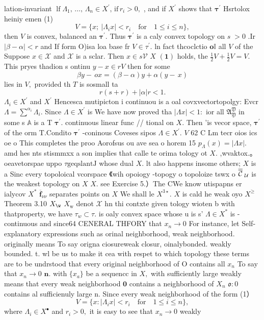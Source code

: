 lation-invariant $\operatorname*{lf}\Lambda_{1},\,\ldots,\,\Lambda_{n}\in X^{\prime},\,\mathrm{if}\,r_{i}>0,$ , and if $X^{\prime}$ shows that ${\boldsymbol{\tau}}^{\prime}$ Hsrtolox heiniy emen (1) $$ V=\{x;\ |\Lambda_{i}x|<r_{i}\quad\mathrm{for}\quad1\leq i\leq n\}, $$ then ${\mathbf{}}V$ is convex, balanced an ${\boldsymbol{\tau}}^{\prime}.$ Thus ${\boldsymbol{\tau}}^{\prime}$ is a caly convex topology on $\scriptstyle s\;>0$ .Ir $|\beta-\alpha|<r$ and If form O)isa loa base fr $V\in\tau^{'}.$ ln fact thcoclctio $\mathbf{o}\mathbb{I}$ all ${\mathbf{}}V$ of the Suppose $x\in{\mathcal{X}}$ and $\scriptstyle{\mathcal{X}}$ is a sclar. Then $x\in s{\mathcal{V}}$ $\textstyle X$ $\mathbf{(1)}$ holds, the $\textstyle{\frac{1}{2}}V+{\frac{1}{2}}V=V.$ This pryes thadion s ontinu $y-x\in r V$ then for some $$ \beta y-\,o x=(\beta-\alpha)y+\alpha(y-\,x) $$ lies in ${\mathit{V}},$ provided th ${\mathbf{}}T$ is sosmall ta $$ r(s+r)+|\alpha|r<1. $$ $\Lambda_{i}\in X^{\prime}$ and $X^{\prime}$ Hencesca mutipicton i continuou is a oal covxvectortopolgy: Evcr $\Lambda=\sum^{\alpha_{i}}\Lambda_{i}.$ Since $\Lambda\in X^{\prime}$ is We have now proved tha $|\Lambda x|<1:$ ior all ${\mathfrak{A}}_{\mathfrak{Y}}^{\mathfrak{Y}}$ in some s $\mathbb{A}$ is a T ${\boldsymbol{\tau}}^{\prime}.$ continuous linear func // tional on $X.$ Then 'is vecor space, ${\boldsymbol{\tau}}^{\prime}$ of the orm T.Condito ${\boldsymbol{\tau}}^{\prime}$ -coninous Coveses sipos $\Lambda\in X^{\prime}.$ ${\mathbf{}}V$ 62 C Lm tecr oios ics oe o This completes the proo Aorofsus ou ave sea o horem 15 $p_{\Lambda}(x)=|\Lambda x|.$ amd hes nts stismmxx a son implies that calle te orima tology ot $X.$ ,wvaktox.。 oeavetorspae uppo $\tau{\mathrm{geqslantJ}}$ whose dual $X.$ lt also happens insome others; $X$ is a Sinc every topoloical vcorspace 《wih opoiogy -topogy o topoloize tswx o ${\overline{{\overline{{\cal C}}}}}_{\mathrm{{\scriptsize~\mathcal{U}}}}$ is the weakest topology on $X$ $X.$ see Exercise 5.）The CWe know utispapns er ialycov $X^{\ast}$ $\overline{{{\mathbf{f}}}}_{\nu\nu}$ separates points on $X$ We shall le $X^{3\star}.$ $\textstyle X$ is cald he weak oyo $X^{\geq}$ Theorem 3.10 $X_{\w}$ $X_{\mathrm{w}}$ denot $\textstyle{\mathcal{X}}$ hn thi contxte given tology wioten b with thatproperty, we have $\tau_{w}\subset\tau.$ is oaly convex space whose u is s' $\Lambda\in X^{*}$ is -continuous and since64 CENERAL THFORY that $x_{n}\to0$ For instance, let Self-explanatory expressions such as orinal neighborhood, weak neighborhood. originally means To say origna ciosureweak closur, oinalybonded. weakly bounded. t. wl be us to make it cea with respet to which topology these terms are to be undrstood that every original neighborhood of O contains all $\textstyle x_{n}$ To say that $x_{n}\to0$ ${\boldsymbol{n}}.$ with $\scriptstyle\{x_{a}\}$ be a sequencc in $X,$ with sufficiently large weakly means that every weak neighborhood $\mathbf{0}$ contains a neighborhood of $\textstyle{X_{n}}$ ${\mathfrak{o}}\colon0$ contains al sufficienuly large n. Since every weak neighborhood of the form (1） $$ V=\{x\colon|\Lambda_{i}x|<r_{i}\quad{\mathrm{for}}\quad1\leq i\leq n\}, $$ where $\Lambda_{i}\in X^{\bullet}$ and $r_{i}>0,$ it is easy to see that $x_{n}\to0$ weakly 